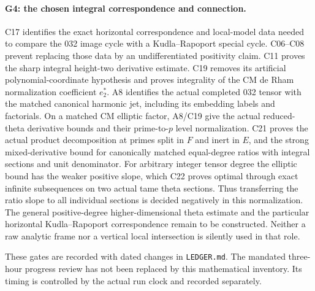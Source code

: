 \paragraph{G4: the chosen integral correspondence and connection.}
C17 identifies the exact horizontal correspondence and local-model
data needed to compare the 032 image cycle with a Kudla--Rapoport
special cycle. C06--C08 prevent replacing those data by an
undifferentiated positivity claim. C11 proves the sharp integral
height-two derivative estimate. C19 removes its artificial
polynomial-coordinate hypothesis and proves integrality of the
CM de Rham normalization coefficient $e_2^*$.
A8 identifies the actual completed 032 tensor with the matched
canonical harmonic jet, including its embedding labels and
factorials. On a matched CM elliptic factor, A8/C19 give the
actual reduced-theta derivative bounds and their prime-to-$p$
level normalization. C21 proves the actual product decomposition
at primes split in $F$ and inert in $E$, and the strong
mixed-derivative bound for canonically matched equal-degree
ratios with integral sections and unit denominator.
For arbitrary integer tensor degree the elliptic bound has
the weaker positive slope, which C22 proves optimal through
exact infinite subsequences on two actual tame theta sections.
Thus transferring the ratio slope to all individual sections
is decided negatively in this normalization.
The general positive-degree higher-dimensional theta estimate
and the particular horizontal Kudla--Rapoport correspondence
remain to be constructed. Neither a raw analytic
frame nor a vertical local intersection is silently used in
that role.

These gates are recorded with dated changes in \texttt{LEDGER.md}.
The mandated three-hour progress review has not been replaced by
this mathematical inventory. Its timing is controlled by the actual
run clock and recorded separately.
